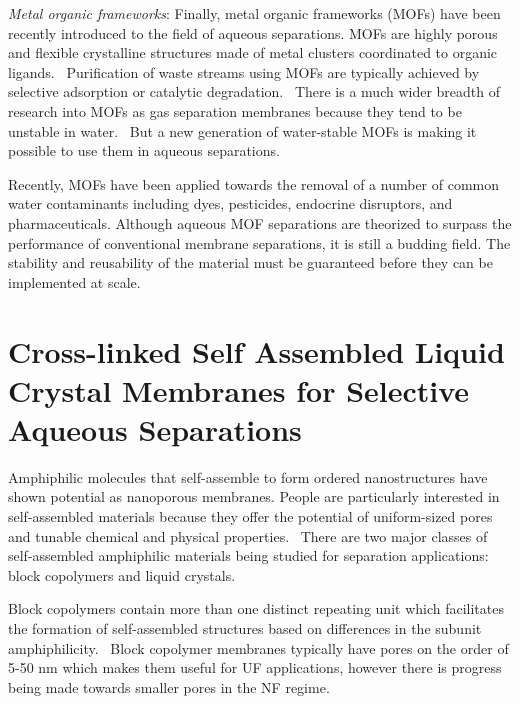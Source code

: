   \textit{Metal organic frameworks}: Finally, metal organic frameworks (MOFs) have been
  recently introduced to the field of aqueous separations. MOFs are highly porous and 
  flexible crystalline structures made of metal clusters coordinated to organic 
  ligands.~\cite{furukawa_chemistry_2013} Purification of waste streams using MOFs 
  are typically achieved by selective adsorption or catalytic degradation.~\cite{li_metalorganic_2012}
  There is a much wider breadth of research into MOFs as gas separation membranes 
  because they tend to be unstable in water.~\cite{feng_construction_2013} But a new
  generation of water-stable MOFs is making it possible to use them in 
  aqueous separations.~\cite{wang_ultrastable_2015} 

  Recently, MOFs have been applied towards the removal of a number of common water 
  contaminants including dyes, pesticides, endocrine disruptors, and pharmaceuticals.
  \cite{zhang_fabrication_2015,seo_adsorptive_2015,li_metalorganic_2015,hasan_adsorptive_2012}
  Although aqueous MOF separations are theorized to surpass the performance 
  of conventional membrane separations, it is still a budding field. The stability and
  reusability of the material must be guaranteed before they can be implemented
  at scale.~\cite{dias_towards_2015}
  
  \section{Cross-linked Self Assembled Liquid Crystal Membranes for Selective Aqueous Separations}
  
  Amphiphilic molecules that self-assemble to form ordered nanostructures have shown
  potential as nanoporous membranes. People are particularly interested in 
  self-assembled materials because they offer the potential of uniform-sized pores
  and tunable chemical and physical properties.~\cite{werber_materials_2016}
  There are two major classes of self-assembled amphiphilic materials being studied
  for separation applications: block copolymers and liquid crystals.
   
  Block copolymers contain more than one distinct repeating unit which facilitates 
  the formation of self-assembled structures based on differences in the subunit 
  amphiphilicity.~\cite{jackson_nanoporous_2010} Block copolymer membranes typically 
  have pores on the order of 5-50 nm which makes them useful for UF applications, 
  however there is progress being made towards smaller pores in the NF regime.~\cite{gu_tailoring_2015}
  
